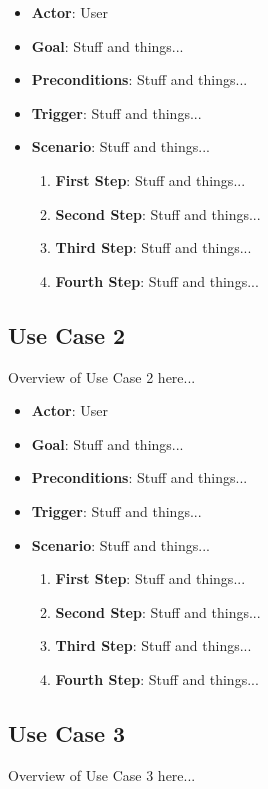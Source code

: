 \documentclass{article}
\begin{document}
\begin{itemize}
    \item \textbf{Actor}: User
    \item \textbf{Goal}: Stuff and things...
    \item \textbf{Preconditions}: Stuff and things...
    \item \textbf{Trigger}: Stuff and things...
    \item \textbf{Scenario}: Stuff and things...
    \begin{enumerate}
    \item \textbf{First Step}: Stuff and things...
    \item \textbf{Second Step}: Stuff and things...
    \item \textbf{Third Step}: Stuff and things...
    \item \textbf{Fourth Step}: Stuff and things...
    \end{enumerate}
\end{itemize}

\subsection{Use Case 2}
Overview of Use Case 2 here...

\begin{itemize}
    \item \textbf{Actor}: User
    \item \textbf{Goal}: Stuff and things...
    \item \textbf{Preconditions}: Stuff and things...
    \item \textbf{Trigger}: Stuff and things...
    \item \textbf{Scenario}: Stuff and things...
    \begin{enumerate}
    \item \textbf{First Step}: Stuff and things...
    \item \textbf{Second Step}: Stuff and things...
    \item \textbf{Third Step}: Stuff and things...
    \item \textbf{Fourth Step}: Stuff and things...
    \end{enumerate}
\end{itemize}

\subsection{Use Case 3}
Overview of Use Case 3 here...
\end{document}

